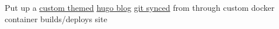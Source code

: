 {Put up a \href{https://github.com/sachiniyer/blog/tree/main/themes/hugo-ink}{custom themed} \href{https://gohugo.io/}{hugo blog} \href{https://blog.sachiniyer.com/posts/post1/}{git synced} from through custom docker container builds/deploys site}
